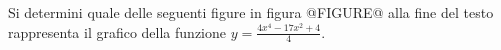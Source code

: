 Si determini quale delle seguenti figure in figura @FIGURE@ alla fine del testo 
rappresenta il grafico della funzione $y=\frac{4x^4-17x^2+4} 4$.
